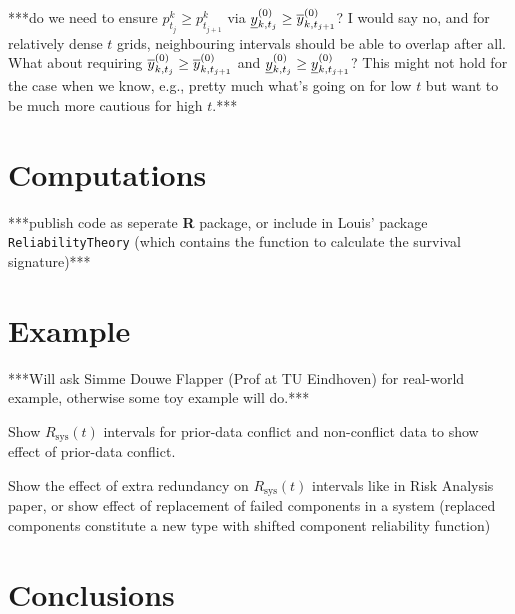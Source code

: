 \documentclass[authoryear, 12pt, a4paper]{elsarticle}
\newcommand{\Rsys}{R_\text{sys}}
\begin{document}
***do we need to ensure $p^k_{t_j} \ge p^k_{t_{j+1}}$ via $\underline{y}^{(0)}_{k,t_j} \ge \overline{y}^{(0)}_{k,t_{j+1}}$?
I would say no, and for relatively dense $t$ grids, neighbouring intervals should be able to overlap after all.
What about requiring $\overline{y}^{(0)}_{k,t_j} \ge \overline{y}^{(0)}_{k,t_{j+1}}$ and $\underline{y}^{(0)}_{k,t_j} \ge \underline{y}^{(0)}_{k,t_{j+1}}$?
This might not hold for the case when we know, e.g., pretty much what's going on for low $t$
but want to be much more cautious for high $t$.***


\section{Computations}

***publish code as seperate \textbf{R} package, or include in Louis' package \texttt{ReliabilityTheory}
(which contains the function to calculate the survival signature)***


\section{Example}

***Will ask Simme Douwe Flapper (Prof at TU Eindhoven) for real-world example,
otherwise some toy example will do.***

Show $\Rsys(t)$ intervals for prior-data conflict and non-conflict data
to show effect of prior-data conflict.

Show the effect of extra redundancy on $\Rsys(t)$ intervals like in Risk Analysis paper,
or show effect of replacement of failed components in a system
(replaced components constitute a new type with shifted component reliability function)


\section{Conclusions}
\end{document}
